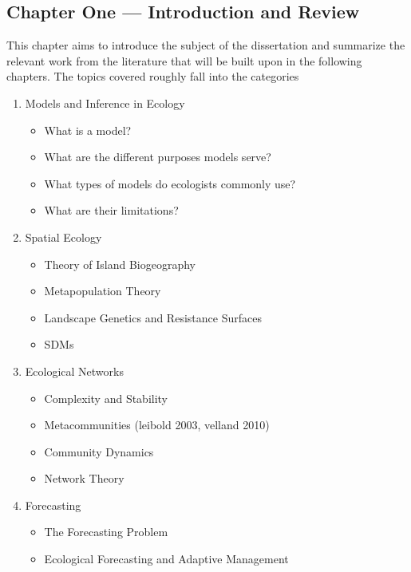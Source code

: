 \documentclass[]{article}
\begin{document}
\subsection{Chapter One --- Introduction and Review}

This chapter aims to introduce the subject of the dissertation and summarize the relevant work from the literature that will be built upon in the following chapters. The topics covered roughly fall into the categories
\begin{enumerate}
    \item Models and Inference in Ecology 
        \begin{itemize}
            \item What is a model? \cite{jaynes, crutchfeld}
            \item What are the different purposes models serve? 
            \item What types of models do ecologists commonly use? 
            \item What are their limitations? 
        \end{itemize}
    
    \item Spatial Ecology
        \begin{itemize}
            \item Theory of Island Biogeography 
            \item Metapopulation Theory
            \item Landscape Genetics and Resistance Surfaces
            \item SDMs
        \end{itemize} 
    
    \item Ecological Networks
        \begin{itemize}
            \item Complexity and Stability 
            \item Metacommunities (leibold 2003, velland 2010)
            \item Community Dynamics  
            \item Network Theory
        \end{itemize}
    \item Forecasting
        \begin{itemize}
            \item The Forecasting Problem
            \item Ecological Forecasting and Adaptive Management
        \end{itemize}
\end{enumerate}
\end{document}
